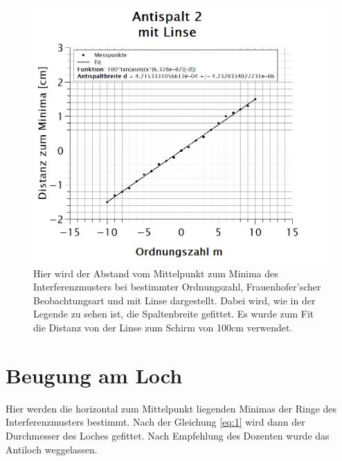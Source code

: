 \begin{figure}[h]
\centering
\includegraphics[width=\textwidth]{Bilder/antispalt2_mitLinse.png} 
\vspace*{-1cm}
\caption[Antispalt 2: mit Linse]{Hier wird der Abstand vom Mittelpunkt zum Minima des Interferenzmusters bei bestimmter Ordnungszahl, Frauenhofer'scher Beobachtungsart und mit Linse dargestellt. Dabei wird, wie in der Legende zu sehen ist, die Spaltenbreite gefittet. Es wurde zum Fit die Distanz von der Linse zum Schirm von 100cm verwendet.}
\label{fig:antispalt2_mitLinse}
\end{figure}
\newpage

\section{Beugung am Loch}
Hier werden die horizontal zum Mittelpunkt liegenden Minimas der Ringe des Interferenzmusters bestimmt. Nach der Gleichung \ref{eq:1} wird dann der Durchmesser des Loches gefittet. Nach Empfehlung des Dozenten wurde das Antiloch weggelassen.

